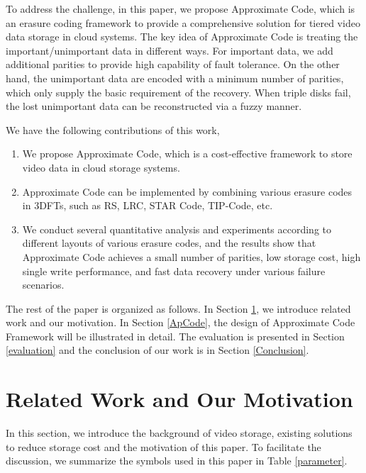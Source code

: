 \documentclass[sigconf]{acmart}
\begin{document}
To address the challenge, in this paper, we propose Approximate Code, which is an erasure coding framework to provide a comprehensive solution for tiered video data storage in cloud systems. The key idea of Approximate Code is treating the important/unimportant data in different ways. For important data, we add additional parities to provide high capability of fault tolerance. On the other hand, the unimportant data are encoded with a minimum number of parities, which only supply the basic requirement of the recovery. When triple disks fail, the lost unimportant data can be reconstructed via a fuzzy manner.

We have the following contributions of this work,
\begin{enumerate}
\item We propose Approximate Code, which is a cost-effective framework to store video data in cloud storage systems.
\item Approximate Code can be implemented by combining various erasure codes in 3DFTs, such as RS, LRC, STAR Code, TIP-Code, etc.
\item We conduct several quantitative analysis and experiments according to different layouts of various erasure codes, and the results show that Approximate Code achieves a small number of parities, low storage cost, high single write performance, and fast data recovery under various failure scenarios.
\end{enumerate}

The rest of the paper is organized as follows. In Section \ref{RelatedWork}, we introduce related work and our motivation.
In Section \ref{ApCode}, the design of Approximate Code Framework will be illustrated in detail.
The evaluation is presented in Section \ref{evaluation} and the conclusion of our work is in Section \ref{Conclusion}.

\section{Related Work and Our Motivation}\label{RelatedWork}
In this section, we introduce the background of video storage, existing solutions to reduce storage cost and the motivation of this paper.
To facilitate the discussion, we summarize the symbols used in this paper in Table \ref{parameter}.
\end{document}
